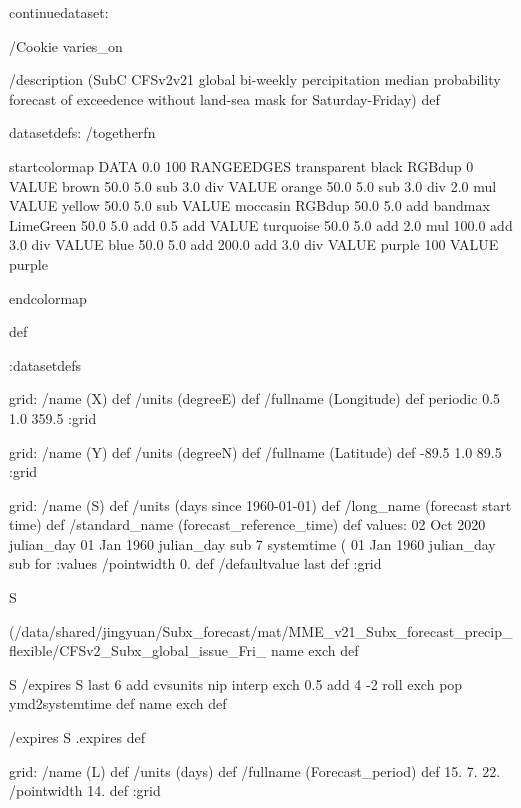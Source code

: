 \begin{ingrid}

continuedataset:


/Cookie varies_on

/description (SubC CFSv2v21 global bi-weekly percipitation median probability forecast of exceedence without land-sea mask for Saturday-Friday) def

datasetdefs:
/togetherfn {
startcolormap 
DATA 0.0 100 RANGEEDGES
    transparent black RGBdup
       0 VALUE
       brown 50.0
         5.0 sub
         3.0 div
         VALUE
         orange 50.0
          5.0 sub
          3.0 div
          2.0 mul
          VALUE
          yellow 50.0
           5.0 sub
           VALUE
          moccasin RGBdup 50.0
             5.0 add
             bandmax
             LimeGreen 50.0
              5.0 add
              0.5 add
              VALUE
              turquoise 50.0
               5.0 add
               2.0 mul
               100.0 add
               3.0 div
               VALUE
               blue 50.0
                5.0 add
                200.0 add
                3.0 div
                VALUE
               purple
                100 VALUE
                purple

endcolormap
} def 

:datasetdefs


grid:
/name (X) def
/units (degreeE) def
/fullname (Longitude) def
periodic
0.5 1.0 359.5
:grid

grid:
/name (Y) def
/units (degreeN) def
/fullname (Latitude) def
-89.5 1.0 89.5
:grid


grid:
/name (S) def
/units (days since 1960-01-01) def
/long_name (forecast start time) def
/standard_name (forecast_reference_time) def
values:
02 Oct 2020 julian_day 01 Jan 1960 julian_day sub
7
systemtime
(%
01 Jan 1960 julian_day sub 
{} for
:values
/pointwidth 0. def
/defaultvalue { last } def
:grid

S {(/data/shared/jingyuan/Subx_forecast/mat/MME_v21_Subx_forecast_precip_flexible/CFSv2_Subx_global_issue_Fri_%
name exch def

S
/expires
S last 6 add cvsunits nip interp exch 0.5 add 4 -2 roll exch pop ymd2systemtime
def
name exch def

/expires S .expires def


grid:
/name (L) def
/units (days) def
/fullname (Forecast_period) def
15. 7. 22.
/pointwidth 14. def
:grid


}
\end{ingrid}
